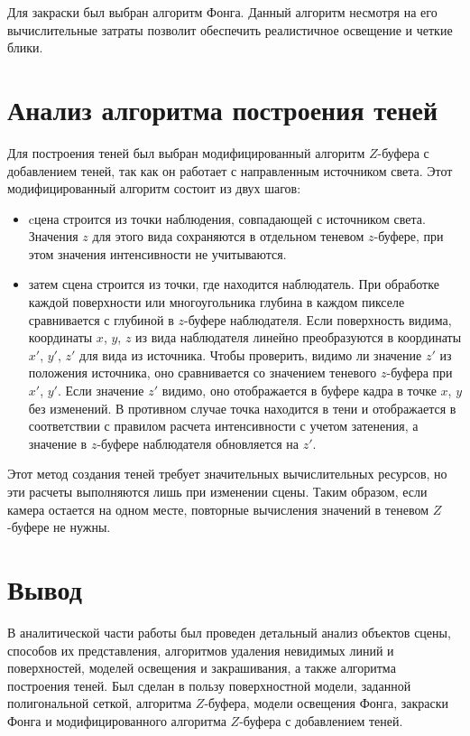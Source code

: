 Для закраски был выбран алгоритм Фонга. Данный алгоритм несмотря на его вычислительные затраты позволит обеспечить реалистичное освещение и четкие блики.

\section{Анализ алгоритма построения теней}

Для построения теней был выбран модифицированный алгоритм $Z$-буфера с добавлением теней, так как он работает с направленным источником света. Этот модифицированный алгоритм состоит из двух шагов:
\begin{itemize}[label=--]
	\item cцена строится из точки наблюдения, совпадающей с источником света. Значения $z$ для этого вида сохраняются в отдельном теневом $z$-буфере, при этом значения интенсивности не учитываются.
	\item затем сцена строится из точки, где находится наблюдатель. При обработке каждой поверхности или многоугольника глубина в каждом пикселе сравнивается с глубиной в $z$-буфере наблюдателя. Если поверхность видима, координаты $x$, $y$, $z$ из вида наблюдателя линейно преобразуются в координаты $x'$, $y'$, $z'$ для вида из источника. Чтобы проверить, видимо ли значение $z'$ из положения источника, оно сравнивается со значением теневого $z$-буфера при $x'$, $y'$. Если значение $z'$ видимо, оно отображается в буфере кадра в точке $x$, $y$ без изменений. В противном случае точка находится в тени и отображается в соответствии с правилом расчета интенсивности с учетом затенения, а значение в $z$-буфере наблюдателя обновляется на $z'$.
\end{itemize}

Этот метод создания теней требует значительных вычислительных ресурсов, но эти расчеты выполняются лишь при изменении сцены. Таким образом, если камера остается на одном месте, повторные вычисления значений в теневом $Z$-буфере не нужны.

\section{Вывод}

В аналитической части работы был проведен детальный анализ объектов сцены, способов их представления, алгоритмов удаления невидимых линий и поверхностей, моделей освещения и закрашивания, а также алгоритма построения теней. Был сделан в пользу поверхностной модели, заданной полигональной сеткой, алгоритма $Z$-буфера, модели освещения Фонга, закраски Фонга и модифицированного алгоритма $Z$-буфера с добавлением теней.

\clearpage
